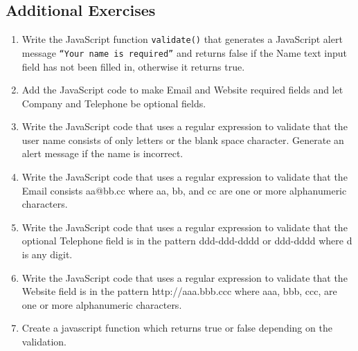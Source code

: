 \documentclass[11pt,a4paper]{article}
\begin{document}
\subsection*{Additional Exercises}
\begin{enumerate}
\item Write the JavaScript function \texttt{validate()} that generates a JavaScript alert message \texttt{``Your name is required''} and returns false if the Name text input field has not been filled in, otherwise it returns true.
\item Add the JavaScript code to make Email and Website required fields and let Company and Telephone be optional fields.
\item Write the JavaScript code that uses a regular expression to validate that the user name consists of only letters or the blank space character. Generate an alert message if the name is incorrect.
\item Write the JavaScript code that uses a regular expression to validate that the Email consists aa@bb.cc where aa, bb, and cc are one or more alphanumeric characters.
\item Write the JavaScript code that uses a regular expression to validate that the optional Telephone field is in the pattern ddd-ddd-dddd or ddd-dddd where d is any digit.
\item Write the JavaScript code that uses a regular expression to validate that the Website field is in the pattern http://aaa.bbb.ccc where aaa, bbb, ccc, are one or more alphanumeric characters.
\item Create a javascript function which returns true or false depending on the validation.
\end{enumerate}
\end{document}
